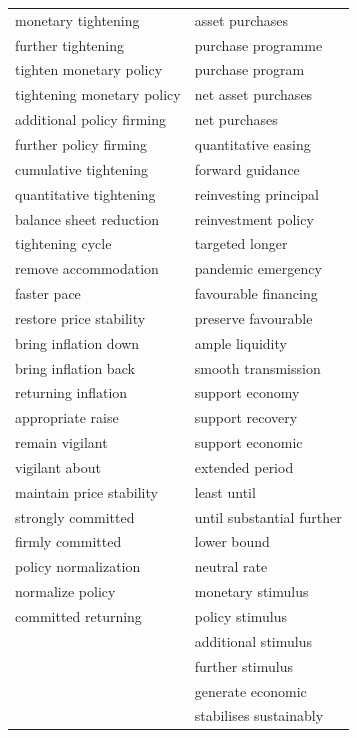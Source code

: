 \begin{longtable}{p{}p{}}
monetary tightening & asset purchases \\
further tightening & purchase programme \\
tighten monetary policy & purchase program \\
tightening monetary policy & net asset purchases \\
additional policy firming & net purchases \\
further policy firming & quantitative easing \\
cumulative tightening & forward guidance \\
quantitative tightening & reinvesting principal \\
balance sheet reduction & reinvestment policy \\
tightening cycle & targeted longer \\
remove accommodation & pandemic emergency \\
faster pace & favourable financing \\
restore price stability & preserve favourable \\
bring inflation down & ample liquidity \\
bring inflation back & smooth transmission \\
returning inflation & support economy \\
appropriate raise & support recovery \\
remain vigilant & support economic \\
vigilant about & extended period \\
maintain price stability & least until \\
strongly committed & until substantial further \\
firmly committed & lower bound \\
policy normalization & neutral rate \\
normalize policy & monetary stimulus \\
committed returning & policy stimulus \\
 & additional stimulus \\
 & further stimulus \\
 & generate economic \\
 & stabilises sustainably \\
\bottomrule
\end{longtable}

